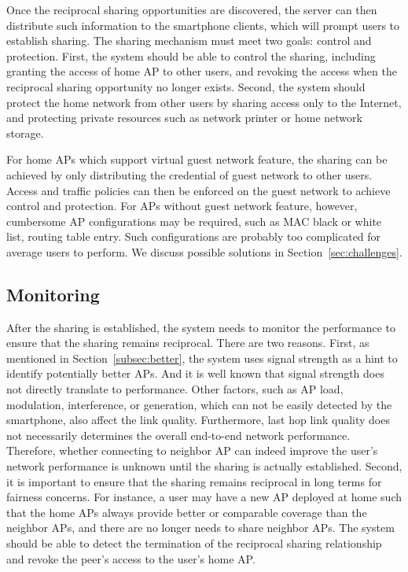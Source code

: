 Once the reciprocal sharing opportunities are discovered, the \wisefi{} server
can then distribute such information to the smartphone clients, which will
prompt users to establish \wifi{} sharing. The sharing mechanism must meet two
goals: control and protection. First, the system should be able to control the
sharing, including granting the access of home AP to other \wisefi{} users, and
revoking the access when the reciprocal sharing opportunity no longer exists.
Second, the system should protect the home network from other \wisefi{} users by
sharing access only to the Internet, and protecting private resources such as
network printer or home network storage.

For home APs which support virtual guest network feature, the \wifi{} sharing
can be achieved by only distributing the credential of guest network to other
\wisefi{} users. Access and traffic policies can then be enforced on the guest
network to achieve control and protection. For APs without guest network
feature, however, cumbersome AP configurations may be required, such as MAC
black or white list, routing table entry. Such configurations are probably too
complicated for average users to perform. We discuss possible solutions in
Section~\ref{sec:challenges}.


\subsection{Monitoring}
\label{subsec:monitoring}

After the sharing is established, the system needs to monitor the \wifi{}
performance to ensure that the sharing remains reciprocal. There are two
reasons. First, as mentioned in Section~\ref{subsec:better}, the system uses
signal strength as a hint to identify potentially better APs. And it is well
known that signal strength does not directly translate to \wifi{} performance.
Other factors, such as AP load, modulation, interference, or \wifi{} generation,
which can not be easily detected by the smartphone, also affect the link
quality. Furthermore, last hop \wifi{} link quality does not necessarily
determines the overall end-to-end network performance. Therefore, whether
connecting to neighbor AP can indeed improve the user's network performance is
unknown until the sharing is actually established. Second, it is important to ensure that
the sharing remains reciprocal in long terms for fairness concerns. For
instance, a \wisif{} user may have a new AP deployed at home such that the home APs
always provide better or comparable \wifi{} coverage than the neighbor APs, and
there are no longer needs to share neighbor APs. The system should be able to
detect the termination of the reciprocal sharing relationship and revoke the
peer's access to the user's home AP.

